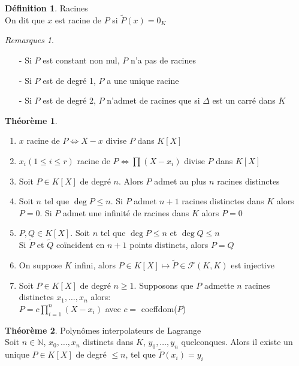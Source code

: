 \documentclass[fleqn]{article}
\theoremstyle{definition} \newtheorem*{defi}{D\'efinition}
\theoremstyle{definition} \newtheorem*{theo}{Th\'eor\`eme}
\theoremstyle{definition} \newtheorem*{coro}{Corollaire}
\theoremstyle{definition} \newtheorem*{nota}{Notation}
\theoremstyle{remark} \newtheorem*{rqs}{Remarques}
\theoremstyle{definition} \newtheorem*{prop}{Propri\'et\'e}
\begin{document}
\begin{defi} Racines \\
	On dit que $x$ est racine de $P$ si $\tilde{P}(x) = 0_K$
	\begin{rqs} $ $
		\begin{itemize}
			\item [-] Si $P$ est constant non nul, $P$ n'a pas de racines
			\item [-] Si $P$ est de degr\'e 1, $P$ a une unique racine
			\item [-] Si $P$ est de degr\'e 2, $P$ n'admet de racines que si $\Delta$ est un carr\'e dans $K$
		\end{itemize}
	\end{rqs}
\end{defi}

\begin{theo} $ $
	\begin{enumerate}
		\item $x$ racine de $P \Leftrightarrow X - x$ divise $P$ dans $K[X]$
		\item $x_i (1 \leq i \leq r)$ racine de $P \Leftrightarrow \prod (X - x_i)$ divise $P$ dans $K[X]$
		\item Soit $P \in K[X]$ de degr\'e $n$. Alors $P$ admet au plus $n$ racines distinctes
		\item Soit $n$ tel que $\deg P \leq n$. Si $P$ admet $n+1$ racines distinctes dans $K$ alors $P = 0$.
			Si $P$ admet une infinit\'e de racines dans $K$ alors $P = 0$
		\item $P,Q \in K[X]$. Soit $n$ tel que $\deg P \leq n$ et $\deg Q \leq n$ \\
			Si $\tilde{P}$ et $\tilde{Q}$ co\"incident en $n+1$ points distincts, alors $P=Q$
		\item On suppose $K$ infini, alors $P \in K[X] \mapsto \tilde{P} \in \mathcal{F}(K,K)$ est injective
		\item Soit $P \in K[X]$ de degr\'e $n \geq 1$. Supposons que $P$ admette $n$ racines distinctes $x_1, \hdots, x_n$ alors: \\
			$P = c\prod_{i=1}^n(X-x_i)$ avec $c = $ coeffdom($P$)
	\end{enumerate}
\end{theo}

\begin{theo} Polyn\^omes interpolateurs de Lagrange \\
	Soit $n\in \mathbb{N}$, $x_0, \hdots, x_n$ distincts dans $K$, $y_0, \hdots, y_n$ quelconques. Alors il existe un unique $P \in K[X]$
	de degr\'e $\leq n$, tel que $\tilde{P}(x_i) = y_i$
\end{theo}
\end{document}
